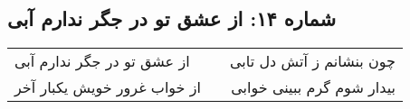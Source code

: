 \begin{center}
\section*{شماره ۱۴: از عشق تو در جگر ندارم آبی}
\label{sec:014}
\begin{longtable}{l p{0.5cm} r}
از عشق تو در جگر ندارم آبی
&&
چون بنشانم ز آتش دل تابی
\\
از خواب غرور خویش یکبار آخر
&&
بیدار شوم گرم ببینی خوابی
\\
\end{longtable}
\end{center}
